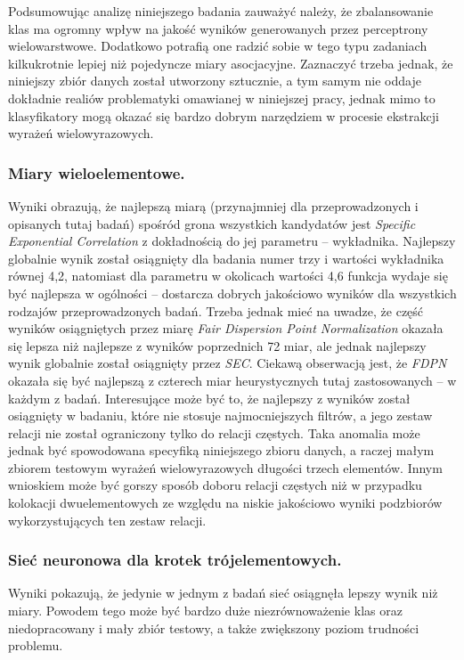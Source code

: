 \documentclass[11pt,a4paper]{llncs}
\begin{document}
\par
Podsumowując analizę niniejszego badania zauważyć należy, że zbalansowanie klas ma ogromny wpływ na jakość wyników generowanych przez perceptrony wielowarstwowe.
Dodatkowo potrafią one radzić sobie w tego typu zadaniach kilkukrotnie lepiej niż pojedyncze miary asocjacyjne.
Zaznaczyć trzeba jednak, że niniejszy zbiór danych został utworzony sztucznie, a tym samym nie oddaje dokładnie realiów problematyki omawianej w niniejszej pracy, jednak mimo to klasyfikatory mogą okazać się bardzo dobrym narzędziem w procesie ekstrakcji wyrażeń wielowyrazowych.


\subsubsection{Miary wieloelementowe.}
Wyniki obrazują, że najlepszą miarą (przynajmniej dla przeprowadzonych i opisanych tutaj badań) spośród grona wszystkich kandydatów jest \emph{Specific Exponential Correlation} z dokładnością do jej parametru -- wykładnika.
Najlepszy globalnie wynik został osiągnięty dla badania numer trzy i wartości wykładnika równej 4,2, natomiast dla parametru w okolicach wartości 4,6 funkcja wydaje się być najlepsza w ogólności -- dostarcza dobrych jakościowo wyników dla wszystkich rodzajów przeprowadzonych badań.
Trzeba jednak mieć na uwadze, że część wyników osiągniętych przez miarę \emph{Fair Dispersion Point Normalization} okazała się lepsza niż najlepsze z wyników poprzednich 72 miar, ale jednak najlepszy wynik globalnie został osiągnięty przez \emph{SEC}.
Ciekawą obserwacją jest, że \emph{FDPN} okazała się być najlepszą z czterech miar heurystycznych tutaj zastosowanych -- w każdym z badań.
Interesujące może być to, że najlepszy z wyników został osiągnięty w badaniu, które nie stosuje najmocniejszych filtrów, a jego zestaw relacji nie został ograniczony tylko do relacji częstych.
Taka anomalia może jednak być spowodowana specyfiką niniejszego zbioru danych, a raczej małym zbiorem testowym wyrażeń wielowyrazowych długości trzech elementów.
Innym wnioskiem może być gorszy sposób doboru relacji częstych niż w przypadku kolokacji dwuelementowych ze względu na niskie jakościowo wyniki podzbiorów wykorzystujących ten zestaw relacji.


\subsubsection{Sieć neuronowa dla krotek trójelementowych.}
Wyniki pokazują, że jedynie w jednym z badań sieć osiągnęła lepszy wynik niż miary.
Powodem tego może być bardzo duże niezrównoważenie klas oraz niedopracowany i mały zbiór testowy, a także zwiększony poziom trudności problemu.
\end{document}
